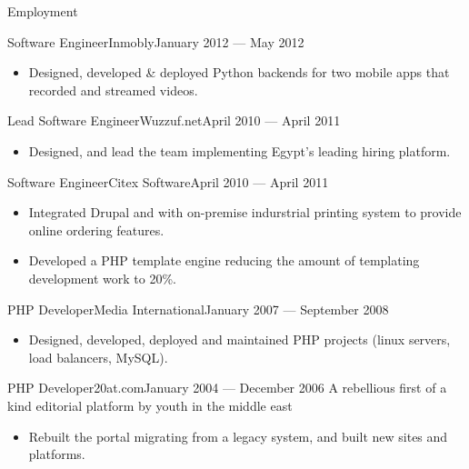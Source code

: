 \documentclass[]{mosabcv}
\begin{document}
\begin{cvsection}{Employment}
  \begin{cvsubsection}{Software Engineer}{Inmobly}{January 2012 --- May 2012}
    \begin{itemize}
      \item Designed, developed \& deployed Python backends for two mobile apps
        that recorded and streamed videos.
    \end{itemize}
  \end{cvsubsection}

  \begin{cvsubsection}{Lead Software Engineer}{Wuzzuf.net}{April 2010 --- April
    2011}
    \begin{itemize}
      \item Designed, and lead the team implementing Egypt's leading hiring platform.
    \end{itemize}
  \end{cvsubsection}

  \begin{cvsubsection}{Software Engineer}{Citex Software}{April 2010 --- April
    2011}
    \begin{itemize}
      \item Integrated Drupal and with on-premise indurstrial printing system
        to provide online ordering features.
      \item Developed a PHP template engine reducing the amount of templating
        development work to 20\%.
    \end{itemize}
  \end{cvsubsection}

  \begin{cvsubsection}{PHP Developer}{Media International}{January 2007 ---
    September 2008}
    \begin{itemize}
      \item Designed, developed, deployed and maintained PHP projects (linux
        servers, load balancers, MySQL).
    \end{itemize}
  \end{cvsubsection}

  \begin{cvsubsection}{PHP Developer}{20at.com}{January 2004 --- December 2006}
    A rebellious first of a kind editorial platform by youth in the middle east
    \begin{itemize}
      \item Rebuilt the portal migrating from a legacy system, and built new
        sites and platforms.
    \end{itemize}
  \end{cvsubsection}

\end{cvsection}
\end{document}
